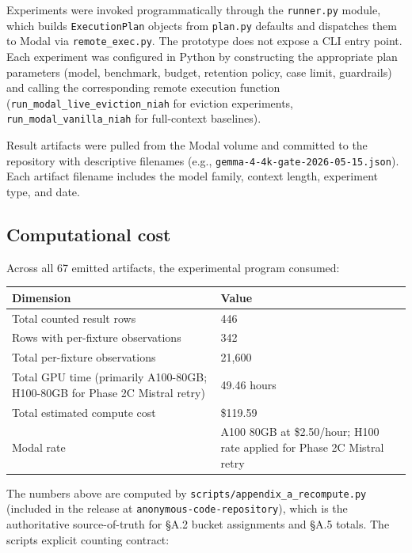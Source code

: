 \documentclass[10pt]{article}
\newcounter{none} %
\begin{document}
Experiments were invoked programmatically through the \texttt{runner.py}
module, which builds \texttt{ExecutionPlan} objects from
\texttt{plan.py} defaults and dispatches them to Modal via
\texttt{remote\_exec.py}. The prototype does not expose a CLI entry
point. Each experiment was configured in Python by constructing the
appropriate plan parameters (model, benchmark, budget, retention policy,
case limit, guardrails) and calling the corresponding remote execution
function (\texttt{run\_modal\_live\_eviction\_niah} for eviction
experiments, \texttt{run\_modal\_vanilla\_niah} for full-context
baselines).

Result artifacts were pulled from the Modal volume and committed to the
repository with descriptive filenames (e.g.,
\texttt{gemma-4-4k-gate-2026-05-15.\allowbreak{}json}). Each artifact filename
includes the model family, context length, experiment type, and date.

\subsection{Computational cost}\label{a5-computational-cost}

Across all 67 emitted artifacts, the experimental program consumed:

{\def\LTcaptype{none} %
{\scriptsize\setlength{\tabcolsep}{2pt}\renewcommand{\arraystretch}{0.92} \begin{longtable}[]{@{}p{4.5cm}p{6.5cm}@{}}
\toprule\noalign{}
Dimension & Value \\
\midrule\noalign{}
\endhead
\bottomrule\noalign{}
\endlastfoot
Total counted result rows & 446 \\
Rows with per-fixture observations & 342 \\
Total per-fixture observations & 21,600 \\
Total GPU time (primarily A100-80GB; H100-80GB for Phase 2C Mistral
retry) & 49.46 hours \\
Total estimated compute cost & \$119.59 \\
Modal rate & A100 80GB at \$2.50/hour; H100 rate applied for Phase 2C
Mistral retry \\
\end{longtable}}
}

The numbers above are computed by
\texttt{scripts/\allowbreak{}appendix\_a\_recompute.\allowbreak{}py} (included in the release at
\texttt{anonymous-code-repository}), which is the authoritative
source-of-truth for \S{}A.2 bucket assignments and \S{}A.5 totals. The
script\textquotesingle s explicit counting contract:
\end{document}
